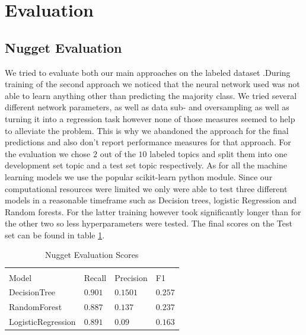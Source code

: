 \documentclass{article}
\begin{document}
\section{Evaluation}
\label{sec:eval}

\subsection{Nugget Evaluation}
We tried to evaluate both our main approaches on the labeled dataset %
.During training of the second approach we noticed that the neural network used was not able to learn anything other than predicting the majority class. We tried several different network parameters, as well as data sub- and oversampling as well as turning it into a regression task however none of those measures seemed to help to alleviate the problem. This is why we abandoned the approach for the final predictions and also don't report performance measures for that approach. For the evaluation we chose $2$ out of the $10$ labeled topics and split them into one development set topic and a test set topic respectively. As for all the machine learning models we use the popular scikit-learn python module. Since our computational resources were limited we only were able to test three different models in a reasonable timeframe such as Decision trees, logistic Regression and Random forests. For the latter training however took significantly longer than for the other two so less hyperparameters were tested.
The final scores on the Test set can be found in table \ref{Nugget_scores}.
\begin{table}
	\caption{Nugget Evaluation Scores}
	\label{Nugget_scores}
	\centering
	\begin{tabular}{llll}
		\toprule
		\multicolumn{4}{c}{}                   \\

		Model     & Recall & Precision & F1 \\
		\midrule
		DecisionTree & $0.901$  & $0.1501$ &   $0.257$   \\
		RandomForest     & $0.887$ & $0.137$ &   $0.237$   \\
		LogisticRegression     &  $0.891$ & $0.09$ & $0.163$  \\
		\bottomrule
	\end{tabular}
\end{table}
\end{document}
